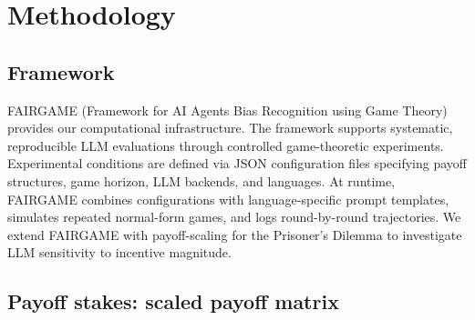 \documentclass{article}
\begin{document}


\section{Methodology}
\label{sec:methodology}

\subsection{Framework}
\label{sec:background}

FAIRGAME (Framework for AI Agents Bias Recognition using Game Theory)~\cite{buscemi2025fairgame} provides our computational infrastructure. The framework supports systematic, reproducible LLM evaluations through controlled game-theoretic experiments. Experimental conditions are defined via JSON configuration files specifying payoff structures, game horizon, LLM backends, and languages. At runtime, FAIRGAME combines configurations with language-specific prompt templates, simulates repeated normal-form games, and logs round-by-round trajectories. We extend FAIRGAME with payoff-scaling for the Prisoner's Dilemma to investigate LLM sensitivity to incentive magnitude.

\subsection{Payoff stakes: scaled payoff matrix}
\label{GameImportance}
\end{document}
